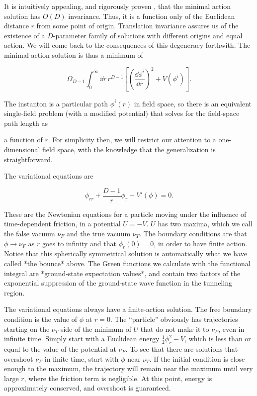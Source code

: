 It is intuitively appealing, and rigorously proven \cite{banks-ref-139}, that the minimal
action solution has $O(D)$ invariance. Thus, it is a function only of the
Euclidean distance $r$ from some point of origin. Translation invariance assures
us of the existence of a $D$-parameter family of solutions with different
origins and equal action. We will come back to the consequences of this
degeneracy forthwith. The minimal-action solution is thus a minimum of

\[
  \Omega_{D-1}\int_0^\infty\dd r\,r^{D-1}
  \left[\left(\frac{\dd\phi^i}{\dd r}\right)^2+V(\phi^i)\right].
\]

The instanton is a particular path $\phi^i(r)$ in field space, so there is an
equivalent single-field problem (with a modified potential) that solves for the
field-space path length as

a function of $r$. For simplicity then, we will restrict our attention to a
one-dimensional field space, with the knowledge that the generalization is
straightforward.

The variational equations are

\[
  \phi_{rr}+\frac{D-1}{r}\phi_r-V'(\phi)=0.
\]

These are the Newtonian equations for a particle moving under the influence of
time-dependent friction, in a potential $U=-V$. $U$ has two maxima, which we
call the false vacuum $\nu_F$ and the true vacuum $\nu_T$. The boundary
conditions are that $\phi\to\nu_F$ as $r$ goes to infinity and that
$\phi_r(0)=0$, in order to have finite action. Notice that this spherically
symmetrical solution is automatically what we have called *the bounce* above.
The Green functions we calculate with the functional integral are *ground-state
expectation values*, and contain two factors of the exponential suppression of
the ground-state wave function in the tunneling region.

The variational equations always have a finite-action solution. The free boundary
condition is the value of $\phi$ at $r=0$. The ``particle'' obviously has
trajectories starting on the $\nu_T$ side of the minimum of $U$ that do not make
it to $\nu_F$, even in infinite time. Simply start with a Euclidean energy
$\tfrac12\phi_r^2-V$, which is less than or equal to the value of the potential
at $\nu_F$. To see that there are solutions that overshoot $\nu_F$ in finite
time, start with $\phi$ near $\nu_T$. If the initial condition is close enough
to the maximum, the trajectory will remain near the maximum until very large
$r$, where the friction term is negligible. At this point, energy is
approximately conserved, and overshoot is guaranteed.

